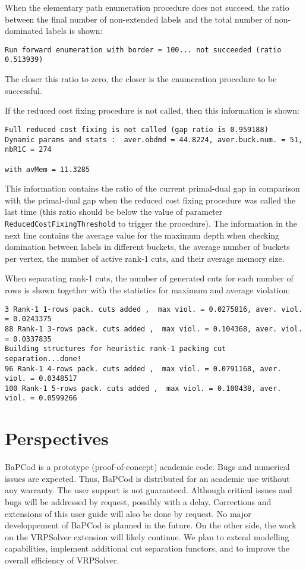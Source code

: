 \documentclass[10pt,a4paper]{article}
\newcommand{\bc}{BaPCod\xspace}
\begin{document}
\medskip
When the elementary path enumeration procedure does not succeed, the ratio between the final number of non-extended
labels and the total number of non-dominated labels is shown:
\footnotesize
\begin{verbatim}
Run forward enumeration with border = 100... not succeeded (ratio 0.513939) 
\end{verbatim}
\normalsize
The closer this ratio to zero, the closer is the enumeration procedure to be successful. 

\medskip
If the reduced cost fixing procedure is not called, then this information is shown:
\scriptsize
\begin{verbatim}
Full reduced cost fixing is not called (gap ratio is 0.959188)
Dynamic params and stats :  aver.obdmd = 44.8224, aver.buck.num. = 51, nbR1C = 274 
                                                                       with avMem = 11.3285
\end{verbatim}
\normalsize
This information contains the ratio of the current primal-dual gap in comparison with the primal-dual gap when the
reduced cost fixing procedure was called the last time (this ratio should be below the value of parameter\\
\verb+ReducedCostFixingThreshold+ to trigger the procedure). The information in the next line contains the average value
for the maximum depth when checking domination between labels in different buckets, the average number of buckets per
vertex, the number of active rank-1 cuts, and their average memory size. 

\medskip
When separating rank-1 cuts, the number of generated cuts for each number of rows is shown together with the statistics
for maximum and average violation:
\footnotesize
\begin{verbatim}
3 Rank-1 1-rows pack. cuts added ,  max viol. = 0.0275816, aver. viol. = 0.0243375
88 Rank-1 3-rows pack. cuts added ,  max viol. = 0.104368, aver. viol. = 0.0337835
Building structures for heuristic rank-1 packing cut separation...done!
96 Rank-1 4-rows pack. cuts added ,  max viol. = 0.0791168, aver. viol. = 0.0348517
100 Rank-1 5-rows pack. cuts added ,  max viol. = 0.100438, aver. viol. = 0.0599266
\end{verbatim}
\normalsize

\section{Perspectives}

\bc is a prototype (proof-of-concept) academic code. Bugs and numerical issues are expected. Thus, \bc is distributed
for an academic use without any warranty. The user support is not guaranteed. Although critical issues and bugs will be
addressed by request, possibly with a delay.  Corrections and extensions of this user guide will also be done by
request. No major developpement of \bc is planned in the future. On the other side, the work on the VRPSolver extension
will likely continue. We plan to extend modelling capabilities, implement additional cut separation functors, and to
improve the overall efficiency of VRPSolver.
\end{document}
